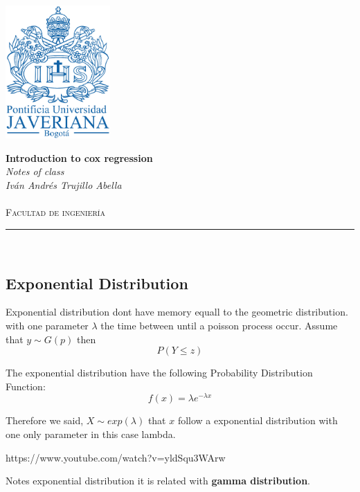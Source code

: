 \documentclass[10pt,a4paper]{article}
\author{Iván Andrés Trujillo }
\begin{document}
\newcommand{\HRule}{\rule{\linewidth}{0.5mm}}


\includegraphics[width = 4cm]{pujshield.eps}\\[0.5cm] 

\begin{center} 
\textbf{\LARGE Introduction to cox regression}\\[0.2cm]
\emph{\LARGE Notes of class}\\[0.3cm] 
\emph{Iván Andrés Trujillo Abella} \\
\textsc{\Large 
}\\[0.2cm] 
\textsc{\large Facultad de ingeniería}\\[0.5cm] 
\HRule \\[0.4cm]
\end{center}
\vspace{1cm}





\subsection{Exponential Distribution}
Exponential distribution dont have memory equall to the geometric distribution.
with one parameter $\lambda$  the time between until a  poisson process occur.
Assume that $y \sim G(p)$ then
$$ P(Y \leq z) 	$$


The exponential distribution have the following Probability Distribution Function:
$$f(x)=\lambda e^{- \lambda x}$$
 
Therefore we said, $ X \sim exp(\lambda)$ that $x$ follow a exponential distribution
with one only parameter in this case lambda. 

https://www.youtube.com/watch?v=yldSqu3WArw

Notes exponential distribution it is related with \textbf{gamma distribution}.
\end{document}
